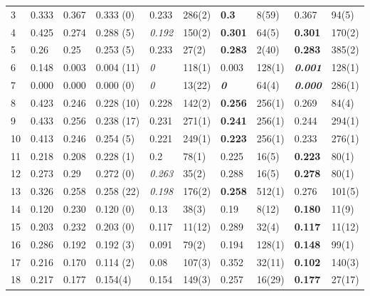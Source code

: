 \begin{center}
\begin{supertabular}{|p{0.15cm}|p{1cm}ll|ll|ll|ll|}
3 & 0.333 & 0.367 & 0.333 (0)  & 0.233 & 286(2) & \textbf{0.3} & 8(59) & 0.367 &
94(5)\tabularnewline 




4 & 0.425 & 0.274 & 0.288 (5)  & \emph{0.192} & 150(2) & \textbf{0.301} & 64(5) &
\textbf{0.301} & 170(2)\tabularnewline 




5 & 0.26 & 0.25 & 0.253 (5)  & 0.233 & 27(2) &  \textbf{0.283}  & 2(40) &
\textbf{0.283} & 385(2)\tabularnewline 







6 & 0.148 & 0.003 & 0.004 (11)  & \emph{0} & 118(1) & 0.003 & 128(1) &
\textbf{\emph{0.001}} & 128(1)\tabularnewline 


7 & 0.000 & 0.000 & 0.000 (0)  & \emph{0} & 13(22) & \textbf{\emph{0}} & 64(4) &
\textbf{\emph{0.000}} & 286(1)\tabularnewline 


8 & 0.423 & 0.246 & 0.228 (10)  & 0.228 & 142(2) & \textbf{0.256} & 256(1) &
0.269 & 84(4)\tabularnewline 


9 & 0.433 & 0.256 & 0.238 (17)  & 0.231 & 271(1) & \textbf{0.241} & 256(1) &
0.244 & 294(1)\tabularnewline 


10 & 0.413 & 0.246 & 0.254 (5)  & 0.221 & 249(1) & \textbf{0.223} & 256(1) & 0.233
& 276(1)\tabularnewline 


11 & 0.218 & 0.208 & 0.228 (1)  & 0.2 & 78(1) &  0.225  & 16(5) & \textbf{0.223} &
80(1)\tabularnewline 


12 & 0.273 & 0.29 & 0.272 (0)  & \emph{0.263} & 35(2) &  0.288  & 16(5) &
\textbf{0.278} & 80(1)\tabularnewline 


13 & 0.326 & 0.258 & 0.258 (22)  &\emph{0.198} & 176(2) & \textbf{ 0.258}  & 512(1) &
0.276 & 101(5)\tabularnewline 


14 & 0.120 & 0.230 & 0.120 (0)  & 0.13 & 38(3) & 0.19 & 8(12) & \textbf{0.180} &
11(9)\tabularnewline 


15 & 0.203 & 0.232 & 0.203 (0)  & 0.117 & 11(12) & 0.289 & 32(4) & \textbf{0.117}
& 11(12)\tabularnewline 


16 & 0.286 & 0.192 & 0.192 (3)  & 0.091 & 79(2) & 0.194 & 128(1) & \textbf{0.148}
& 99(1)\tabularnewline 


17 & 0.216 & 0.170 & 0.114 (2)  & 0.08 & 107(3) & 0.352 & 32(11) & \textbf{0.102}
& 140(3)\tabularnewline 


18 & 0.217 & 0.177 & 0.154(4)  & 0.154 & 149(3) & 0.257 & 16(29) & \textbf{0.177} &
27(17)\tabularnewline 



\end{supertabular}
\end{center}
